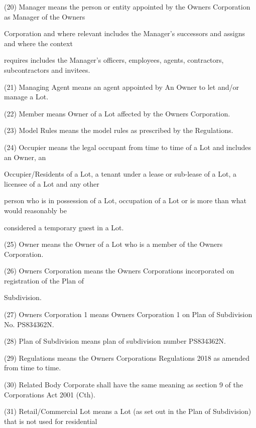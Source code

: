 \documentclass{article}
\begin{document}
{\fontsize{9.962}{1}(20) Manager means the person or entity appointed by the Owners Corporation as Manager of the Owners }

{\fontsize{10.02}{1}Corporation and where relevant includes the Manager’s successors and assigns and where the context }

{\fontsize{10.02}{1}requires includes the Manager’s officers, employees, agents, contractors, subcontractors and invitees. }

{\fontsize{9.962}{1}(21) Managing Agent means an agent appointed by An Owner to let and/or manage a Lot. }

\newpage

{\fontsize{9.962}{1}(22) Member means Owner of a Lot affected by the Owners Corporation. }

{\fontsize{9.962}{1}(23) Model Rules means the model rules as prescribed by the Regulations. }

{\fontsize{9.962}{1}(24) Occupier means the legal occupant from time to time of a Lot and includes an Owner, an }

{\fontsize{10.02}{1}Occupier/Residents of a Lot, a tenant under a lease or sub-lease of a Lot, a licensee of a Lot and any other }

{\fontsize{10.02}{1}person who is in possession of a Lot, occupation of a Lot or is more than what would reasonably be }

{\fontsize{10.02}{1}considered a temporary guest in a Lot. }

{\fontsize{9.962}{1}(25) Owner means the Owner of a Lot who is a member of the Owners Corporation. }

{\fontsize{9.962}{1}(26) Owners Corporation means the Owners Corporations incorporated on registration of the Plan of }

{\fontsize{10.02}{1}Subdivision. }

{\fontsize{9.962}{1}(27) Owners Corporation 1 means Owners Corporation 1 on Plan of Subdivision No. PS834362N. }

{\fontsize{9.962}{1}(28) Plan of Subdivision means plan of subdivision number PS834362N. }

{\fontsize{9.962}{1}(29) Regulations means the Owners Corporations Regulations 2018 as amended from time to time. }

{\fontsize{9.962}{1}(30) Related Body Corporate shall have the same meaning as section 9 of the Corporations Act 2001 (Cth). }

{\fontsize{9.962}{1}(31) Retail/Commercial Lot means a Lot (as set out in the Plan of Subdivision) that is not used for residential }
\end{document}
